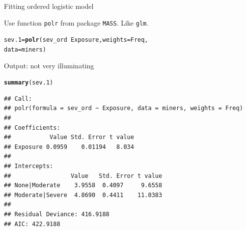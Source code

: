 \documentclass[unknownkeysallowed]{beamer}\usepackage[]{graphicx}\usepackage[]{color}
\makeatletter
\newcommand{\hlopt}[1]{\textcolor[rgb]{0,0,0}{#1}}%
\newcommand{\hlstd}[1]{\textcolor[rgb]{0.345,0.345,0.345}{#1}}%
\newcommand{\hlkwb}[1]{\textcolor[rgb]{0.69,0.353,0.396}{#1}}%
\newcommand{\hlkwc}[1]{\textcolor[rgb]{0.333,0.667,0.333}{#1}}%
\newcommand{\hlkwd}[1]{\textcolor[rgb]{0.737,0.353,0.396}{\textbf{#1}}}%
\newenvironment{kframe}{%
 \def\at@end@of@kframe{}%
 \ifinner\ifhmode%
  \def\at@end@of@kframe{\end{minipage}}%
  \begin{minipage}{\columnwidth}%
 \fi\fi%
 \def\FrameCommand##1{\hskip\@totalleftmargin \hskip-\fboxsep
 \colorbox{shadecolor}{##1}\hskip-\fboxsep
     \hskip-\linewidth \hskip-\@totalleftmargin \hskip\columnwidth}%
 \MakeFramed {\advance\hsize-\width
   \@totalleftmargin\z@ \linewidth\hsize
   \@setminipage}}%
 {\par\unskip\endMakeFramed%
 \at@end@of@kframe}
\newenvironment{knitrout}{}{} %
\makeatother
\begin{document}
\begin{frame}[fragile]{Fitting ordered logistic model}

Use function \texttt{polr} from package \texttt{MASS}. Like \texttt{glm}.

 
\begin{knitrout}
\color{fgcolor}\begin{kframe}
\begin{alltt}
\hlstd{sev.1}\hlkwb{=}\hlkwd{polr}\hlstd{(sev_ord}\hlopt{~}\hlstd{Exposure,}\hlkwc{weights}\hlstd{=Freq,}
              \hlkwc{data}\hlstd{=miners)}
\end{alltt}
\end{kframe}
\end{knitrout}
  
\end{frame}

\begin{frame}[fragile]{Output: not very illuminating}
  
\begin{knitrout}\small
{}\color{fgcolor}\begin{kframe}
\begin{alltt}
\hlkwd{summary}\hlstd{(sev.1)}
\end{alltt}


{\ttfamily\noindent\itshape\color{messagecolor}{\#\# \\\#\# Re-fitting to get Hessian}}\begin{verbatim}
## Call:
## polr(formula = sev_ord ~ Exposure, data = miners, weights = Freq)
## 
## Coefficients:
##           Value Std. Error t value
## Exposure 0.0959    0.01194   8.034
## 
## Intercepts:
##                 Value   Std. Error t value
## None|Moderate    3.9558  0.4097     9.6558
## Moderate|Severe  4.8690  0.4411    11.0383
## 
## Residual Deviance: 416.9188 
## AIC: 422.9188
\end{verbatim}
\end{kframe}
\end{knitrout}
  
\end{frame}
 
\end{document}
